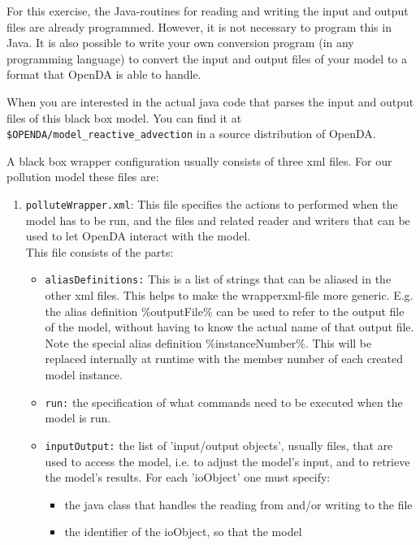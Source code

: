 \documentclass[a4paper,10pt]{article}
\begin{document}
For this exercise, the Java-routines for reading and writing the input and
output files are already programmed. However, it is not necessary to program
this in Java. It is also possible to write your own conversion program (in any
programming language) to convert the input and output files of your model to a
format that OpenDA is able to handle.

When you are interested in the actual java code that parses the input and output files of this black box model. You can find it at \\
{\tt \$OPENDA/model\_reactive\_advection} in a source distribution of OpenDA.

A black box wrapper configuration usually consists of three xml files. For our
pollution model these files are:
\begin{enumerate}
   \item {\tt polluteWrapper.xml}: This file specifies the actions to performed
     when the model has to be run, and the files and related reader and writers
     that can be used to let OpenDA interact with the model.\\ This file
     consists of the parts:
     \begin{itemize}
        \item {\tt aliasDefinitions:} This is a list of strings that can be
          aliased in the other xml files. This helps to make the
          wrapperxml-file more generic. E.g. the alias definition
          \%outputFile\% can be used to refer to the output file of the model,
          without having to know the actual name of that output file.\\ Note
          the special alias definition \%instanceNumber\%. This will be
          replaced internally at runtime with the member number of each created
          model instance.
        \item {\tt run:} the specification of what commands need to be executed
          when the model is run.
        \item {\tt inputOutput:} the list of 'input/output objects', usually
          files, that are used to access the model, i.e. to adjust the model's
          input, and to retrieve the model's results. For each 'ioObject' one
          must specify:
        \begin{itemize}
           \item the java class that handles the reading from and/or writing to
             the file
           \item the identifier of the ioObject, so that the model

\end{itemize}
\end{itemize}
\end{enumerate}
\end{document}
